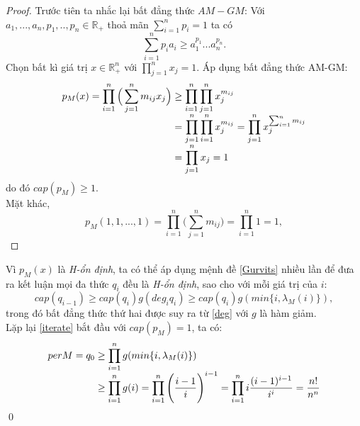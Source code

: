 \documentclass[a4paper, 12pt]{report}
\begin{document}
\begin{proof}
	Trước tiên ta nhắc lại bất đẳng thức $AM-GM$: Với $a_1,...,a_n, p_1,..,p_n \in \mathbb{R}_{+}$ thoả mãn $\sum_{i=1}^{n}p_{i} =1$ ta có
	\begin{equation}
		\displaystyle \sum_{i=1}^{n} p_{i}a_{i} \geq a_{1}^{p_1}...a_{n}^{p_n}. \label{amgm}
	\end{equation}
Chọn bất kì giá trị $x \in \mathbb{R}_{+}^{n}$ với $\prod_{j=1}^{n}x_{j} =1$. Áp dụng bất đẳng thức AM-GM:
\begin{equation*}
\begin{array}{l@{}l}
	p_M(x) = \displaystyle \prod_{i=1}^{n} \Big( \displaystyle \sum_{j=1}^{n} m_{ij}x_{j} \Big) &{}\geq \displaystyle \prod_{i=1}^{n} \displaystyle\prod_{j=1}^{n} x_{j}^{m_{ij}} \\
	&{}= \displaystyle\prod_{j=1}^{n}\displaystyle \prod_{i=1}^{n}x_{j}^{m_{ij}} = \displaystyle\prod_{j=1}^{n} x_j^{\sum_{i=1}^{n} m_{ij}} \\
	&{}= \displaystyle\prod_{j=1}^{n} x_j =1
\end{array}
\end{equation*}
do đó $cap(p_M) \geq 1$. \\
Mặt khác,
\begin{equation}
	p_M(1,1,...,1) = \displaystyle \prod_{i=1}^{n} \Big (\displaystyle \sum_{j=1}^{n} m_{ij} \Big) = \displaystyle\prod_{i=1}^{n} 1 =1,
\end{equation}
\end{proof} 
Vì $p_M(x)$ là \textit{H-ổn định}, ta có thể áp dụng mệnh đề \eqref{Gurvits} nhiều lần để đưa ra kết luận mọi đa thức $q_i$ đều là \textit{H-ổn định}, sao cho với mỗi giá trị của $i$:
\begin{equation}
	cap(q_{i-1}) \geq cap(q_i)g(deg_{i}q_i) \geq cap(q_i)g(min \{i, \lambda_{M}(i)\}), \label{iterate}
\end{equation}
trong đó bất đẳng thức thứ hai được suy ra từ \eqref{deg} với $g$ là hàm giảm.\\ 
Lặp lại  \eqref{iterate}   bắt đầu với $cap(p_M) =1$, ta có:
\begin{equation*}
\begin{array}{l@{}l}
	per M 
	= q_0 &{}\geq \displaystyle \prod_{i=1}^{n} g(min \{i,\lambda_M(i) \} )\\
	&{}\geq \displaystyle \prod_{i=1}^{n}g(i) = \displaystyle \prod_{i=1}^{n} \Bigg( \frac{i-1}{i} \Bigg)^{i-1} = \displaystyle \prod_{i=1}^{n}i\frac{(i-1)^{i-1}}{i^i} = \frac{n!}{n^n}
\end{array}
\end{equation*} \qed
\end{document}
